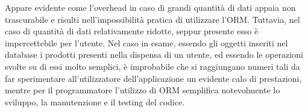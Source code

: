 Appare evidente come l'overhead in caso di grandi quantità di dati appaia non trascurabile e risulti nell'impossibilità pratica di utilizzare l'ORM. Tuttavia, nel caso di quantità di dati relativamente ridotte, seppur presente esso è impercettebile per l'utente. Nel caso in esame, essendo gli oggetti inseriti nel database i prodotti presenti nella dispensa di un utente, ed essendo le operazioni svolte su di essi molto semplici, è improbabile che si raggiungano numeri tali da far sperimentare all'utilizzatore dell'applicazione un evidente calo di prestazioni, mentre per il programmatore l'utilizzo di ORM semplifica notevolmente lo sviluppo, la manutenzione e il testing del codice.
